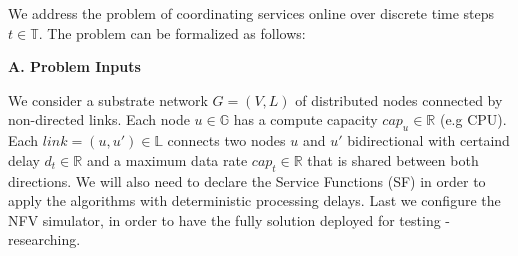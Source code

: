 We address the problem of coordinating services online over
discrete time steps $t \in \mathbb{T}$. The problem can be formalized as
follows:

\textbf{A. Problem Inputs}

We consider a substrate network $G=(V,L)$ of distributed nodes connected by non-directed links. Each node $u \in \mathbb{G}$ has a compute capacity $cap_u \in \mathbb{R}$ (e.g CPU).
Each $link=(u,u') \in \mathbb{L}$ connects two nodes $u$ and $u'$ bidirectional with certaind delay $d_t \in \mathbb{R}$ and a maximum data rate $cap_t \in \mathbb{R}$ that is shared between both directions.
We will also need to declare the Service Functions (SF) in order to apply the algorithms with deterministic processing delays.
Last we configure the NFV simulator, in order to have the fully solution deployed for testing - researching.
